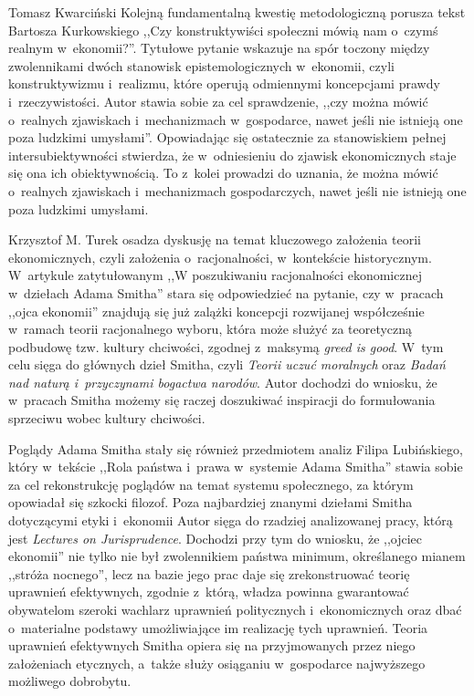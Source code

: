 \begin{editorial}{Tomasz Kwarciński}
Kolejną fundamentalną kwestię metodologiczną porusza tekst Bartosza Kurkowskiego ,,Czy konstruktywiści społeczni mówią
nam o~czymś realnym w~ekonomii?''. Tytułowe pytanie wskazuje na spór toczony między zwolennikami dwóch stanowisk
epistemologicznych w~ekonomii, czyli konstruktywizmu i~realizmu, które operują odmiennymi koncepcjami
prawdy i~rzeczywistości. Autor stawia sobie za cel sprawdzenie, ,,czy można mówić o~realnych
zjawiskach i~mechanizmach w~gospodarce, nawet jeśli nie istnieją one poza ludzkimi umysłami''.
Opowiadając się ostatecznie za stanowiskiem pełnej
intersubiektywności stwierdza, że w~odniesieniu do zjawisk ekonomicznych staje się ona ich obiektywnością. To z~kolei
prowadzi do uznania, że można mówić o~realnych zjawiskach i~mechanizmach gospodarczych, nawet jeśli nie istnieją one
poza ludzkimi umysłami. 

Krzysztof M. Turek osadza dyskusję na temat kluczowego założenia teorii ekonomicznych, czyli założenia o~racjonalności,
w~kontekście historycznym. W~artykule zatytułowanym ,,W poszukiwaniu racjonalności ekonomicznej w~dziełach Adama Smitha''
stara się odpowiedzieć na pytanie, czy w~pracach ,,ojca ekonomii'' znajdują się już zalążki koncepcji rozwijanej
współcześnie w~ramach teorii racjonalnego wyboru, która może służyć za teoretyczną podbudowę tzw. kultury chciwości,
zgodnej z~maksymą \textit{greed is good}. W~tym celu sięga do głównych dzieł Smitha, czyli \textit{Teorii uczuć
moralnych} oraz \textit{Badań nad naturą i~przyczynami bogactwa narodów}. Autor dochodzi do wniosku, że w~pracach
Smitha możemy się raczej doszukiwać inspiracji do formułowania sprzeciwu wobec kultury chciwości. 

Poglądy Adama Smitha stały się również przedmiotem analiz Filipa Lubińskiego, który w~tekście ,,Rola
państwa i~prawa w~systemie Adama Smitha'' stawia sobie za cel rekonstrukcję poglądów na temat systemu społecznego,
za którym opowiadał się
szkocki filozof. Poza najbardziej znanymi dziełami Smitha dotyczącymi etyki i~ekonomii Autor sięga do rzadziej
analizowanej pracy, którą jest \textit{Lectures on Jurisprudence}. Dochodzi przy tym do wniosku, że ,,ojciec ekonomii''
nie tylko nie był zwolennikiem państwa minimum, określanego mianem ,,stróża nocnego'', lecz na bazie jego prac daje się
zrekonstruować teorię uprawnień efektywnych, zgodnie z~którą, władza powinna gwarantować obywatelom szeroki wachlarz
uprawnień politycznych i~ekonomicznych oraz dbać o~materialne podstawy umożliwiające im realizację tych uprawnień.
Teoria uprawnień efektywnych Smitha opiera się na przyjmowanych przez niego założeniach etycznych, a~także służy
osiąganiu w~gospodarce najwyższego możliwego dobrobytu. 


\end{editorial}
